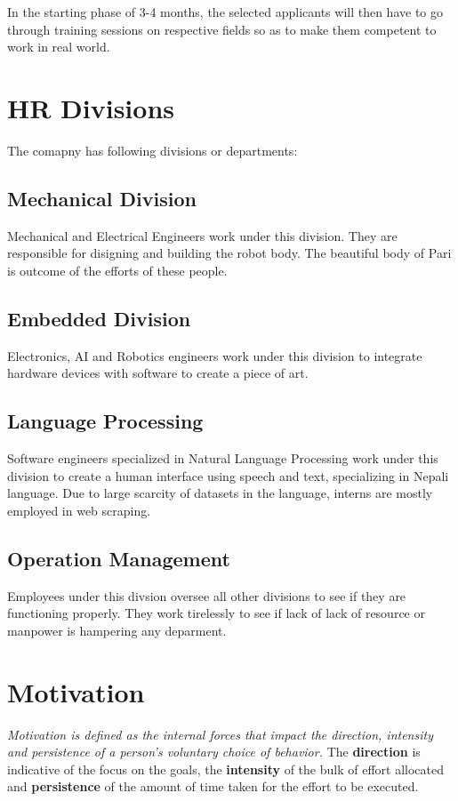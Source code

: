 \documentclass[12pt,a4paper]{scrreprt}
\begin{document}
In the starting phase of 3-4 months, the selected applicants will then have to go through
training sessions on respective fields so as to make them competent to work in real world.
\section{HR Divisions}
The comapny has following divisions or departments:
\subsection{Mechanical Division}
Mechanical and Electrical Engineers work under this division. They are responsible for disigning and building the robot body. The beautiful body of Pari is outcome of the efforts of these people.

\subsection{Embedded Division}
Electronics, AI and Robotics engineers work under this division to integrate hardware devices with software to create a piece of art.

\subsection{Language Processing}
Software engineers specialized in Natural Language Processing work under this division to create a human interface using speech and text, specializing in Nepali language. Due to large scarcity of datasets in the language, interns are mostly employed in web scraping.

\subsection{Operation Management}
Employees under this divsion oversee all other divisions to see if they are functioning properly. They work tirelessly to see if lack of lack of resource or manpower is hampering any deparment.

\section{Motivation}
\textit{Motivation is defined as the internal forces that impact the direction, intensity and persistence of a person’s voluntary choice of behavior.} The \textbf{direction} is indicative of the focus on the goals, the \textbf{intensity} of the bulk of effort allocated and \textbf{persistence} of the amount of time taken for the effort to be executed.
\end{document}
